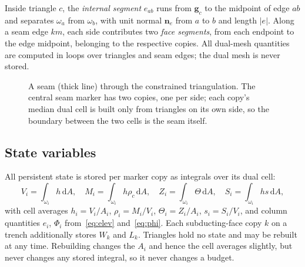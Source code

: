 \documentclass[11pt]{article}
\newcommand{\vect}[1]{\mathbf{#1}}
\newcommand{\dd}{\,\mathrm{d}}
\begin{document}
Inside triangle $c$, the \emph{internal segment} $e_{ab}$ runs from $\vect{g}_c$ to the midpoint of edge $ab$ and separates $\omega_a$ from $\omega_b$, with unit normal $\vect{n}_e$ from $a$ to $b$ and length $|e|$. Along a seam edge $km$, each side contributes two \emph{face segments}, from each endpoint to the edge midpoint, belonging to the respective copies. All dual-mesh quantities are computed in loops over triangles and seam edges; the dual mesh is never stored.

\begin{figure}[ht]
\centering
{}
\caption{A seam (thick line) through the constrained triangulation. The central seam marker has two copies, one per side; each copy's median dual cell is built only from triangles on its own side, so the boundary between the two cells is the seam itself.}
\label{fig:seam}
\end{figure}

\subsection{State variables}
All persistent state is stored per marker copy as integrals over its dual cell:
\begin{equation}
  V_i=\int_{\omega_i}h\dd A,\quad
  M_i=\int_{\omega_i}h\rho_c\dd A,\quad
  Z_i=\int_{\omega_i}\Theta\dd A,\quad
  S_i=\int_{\omega_i}hs\dd A,
\end{equation}
with cell averages $h_i=V_i/A_i$, $\rho_i=M_i/V_i$, $\Theta_i=Z_i/A_i$, $s_i=S_i/V_i$, and column quantities $e_i$, $\Phi_i$ from~\eqref{eq:elev} and~\eqref{eq:phi}. Each subducting-face copy $k$ on a trench additionally stores $W_k$ and $L_k$. Triangles hold no state and may be rebuilt at any time. Rebuilding changes the $A_i$ and hence the cell averages slightly, but never changes any stored integral, so it never changes a budget.
\end{document}
